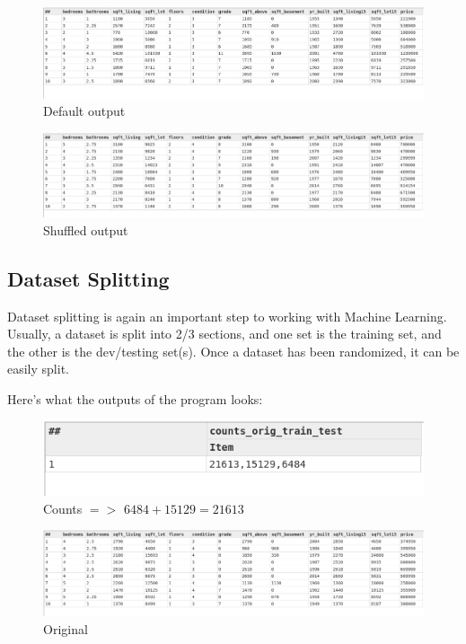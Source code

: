 \documentclass[a4paper,oneside,12pt]{book}
\begin{document}
\begin{figure}[h]
    \centering
    \includegraphics[width=\linewidth]{../output/54/default}
    \caption{Default output}
\end{figure}
\begin{figure}[h]
    \centering
    \includegraphics[width=\linewidth]{../output/54/shuffled}
    \caption{Shuffled output}
\end{figure}


\subsection{Dataset Splitting}

Dataset splitting is again an important step to working with Machine Learning. Usually, a dataset is split into 2/3 sections, and one set is the training set, and the other is the dev/testing set(s). Once a dataset has been randomized, it can be easily split.



Here's what the outputs of the program looks:

\begin{figure}[h]
    \centering
    \includegraphics[width=.7\linewidth]{../output/55/counts}
    \caption{Counts $=>$ $6484+15129=21613$}
\end{figure}

\begin{figure}[h]
    \centering
    \includegraphics[width=\linewidth]{../output/55/original}
    \caption{Original}
\end{figure}
\end{document}
